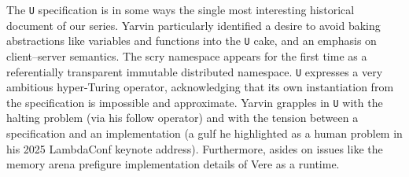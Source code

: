 \documentclass[twoside]{article}
\begin{document}
The \texttt{U} specification is in some ways the single most interesting historical document of our series.  Yarvin particularly identified a desire to avoid baking abstractions like variables and functions into the \texttt{U} cake, and an emphasis on client–server semantics.  The scry namespace appears for the first time as a referentially transparent immutable distributed namespace.  \texttt{U} expresses a very ambitious hyper-Turing operator, acknowledging that its own instantiation from the specification is impossible and approximate.  Yarvin grapples in \texttt{U} with the halting problem (via his follow operator) and with the tension between a specification and an implementation (a gulf he highlighted as a human problem in his 2025 LambdaConf keynote address).  Furthermore, asides on issues like the memory arena prefigure implementation details of Vere as a runtime.
\end{document}
